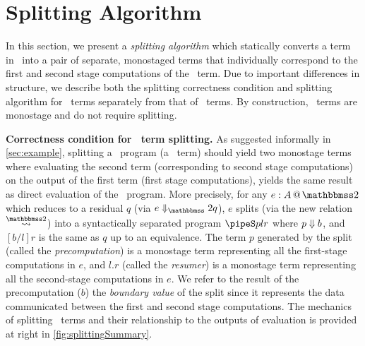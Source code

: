 
\section{Splitting Algorithm}
\label{sec:splitting}



\begin{abstrsyn}


In this section, we present a \emph{splitting algorithm} which
statically converts a term in \lang\ into a pair of separate,
monostaged terms that individually correspond to the first and second
stage computations of the \lang\ term. Due to important differences in
structure, we describe both the splitting correctness condition and
splitting algorithm for \bbonem\ terms separately from that of
\bbtwo\ terms.  By construction, \bbonep\ terms are monostage and do
not require splitting.

\textbf{Correctness condition for \bbtwo\ term splitting.}  As
suggested informally in \ref{sec:example}, splitting a \lang\ program
(a \bbtwo\ term) should yield two monostage terms where evaluating the
second term (corresponding to second stage computations) on the output
of the first term (first stage computations), yields the same result
as direct evaluation of the \lang\ program.  More precisely, for any
$\coltwo e A$ which reduces to a residual $q$ (via $\diatwo e q$), $e$
splits (via the new relation~$\splittwosym$) into a syntactically
separated program $\pipeS p l r$ where ${p} \Downarrow {b}$, and $[b/l]r$ is
the same as $q$ up to an equivalence. The term $p$ generated by the
split (called the {\em precomputation}) is a monostage term
representing all the first-stage computations in $e$, and $l.r$
(called the {\em resumer}) is a monostage term representing all the
second-stage computations in $e$.  We refer to the result of the
precomputation ($b$) the {\em boundary value} of the split since it
represents the data communicated between the first and second stage
computations.  The mechanics of splitting \bbtwo\ terms and their
relationship to the outputs of evaluation is provided at right in
\ref{fig:splittingSummary}.




\end{abstrsyn}
